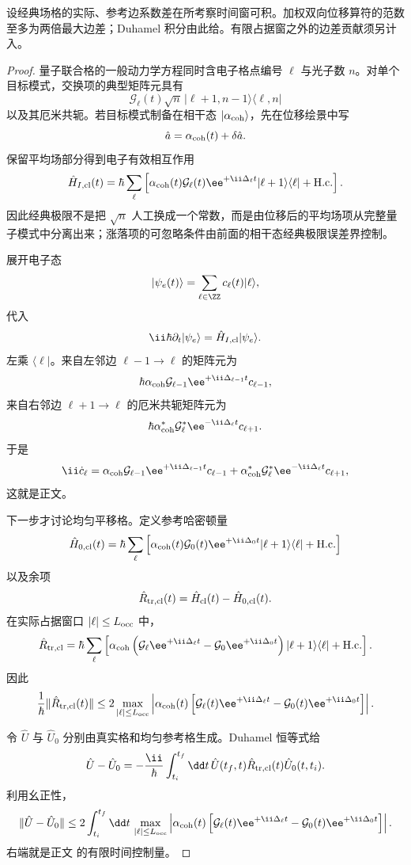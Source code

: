 \begin{proposition}[经典相干格的均匀化误差]
设经典场格的实际、参考边系数差在所考察时间窗可积。加权双向位移算符的范数至多为两倍最大边差；Duhamel 积分由此给。有限占据窗之外的边差贡献须另计入。
\end{proposition}
\begin{proof}
量子联合格的一般动力学方程同时含电子格点编号 $\ell$ 与光子数 $n$。对单个目标模式，交换项的典型矩阵元具有
\[
\mathcal G_\ell(t)
\sqrt{n}\,
|\ell+1,n-1\rangle\langle\ell,n|
\]
以及其厄米共轭。若目标模式制备在相干态 $|\alpha_{\rm coh}\rangle$，先在位移绘景中写
\[
\hat a
=
\alpha_{\rm coh}(t)
+\delta\hat a.
\]
保留平均场部分得到电子有效相互作用
\[
\hat H_{I,\rm cl}(t)
=
\hbar\sum_\ell
\left[
\alpha_{\rm coh}(t)
\mathcal G_\ell(t)
\ee^{+\ii\Delta_\ell t}
|\ell+1\rangle\langle\ell|
+\mathrm{H.c.}
\right].
\]
因此经典极限不是把 $\sqrt n$ 人工换成一个常数，而是由位移后的平均场项从完整量子模式中分离出来；涨落项的可忽略条件由前面的相干态经典极限误差界控制。

展开电子态
\[
|\psi_e(t)\rangle
=
\sum_{\ell\in\ZZ}
c_\ell(t)|\ell\rangle,
\]
代入
\[
\ii\hbar\partial_t|\psi_e\rangle
=
\hat H_{I,\rm cl}|\psi_e\rangle.
\]
左乘 $\langle\ell|$。来自左邻边 $\ell-1\to\ell$ 的矩阵元为
\[
\hbar
\alpha_{\rm coh}
\mathcal G_{\ell-1}
\ee^{+\ii\Delta_{\ell-1}t}
c_{\ell-1},
\]
来自右邻边 $\ell+1\to\ell$ 的厄米共轭矩阵元为
\[
\hbar
\alpha_{\rm coh}^*
\mathcal G_\ell^*
\ee^{-\ii\Delta_\ell t}
c_{\ell+1}.
\]
于是
\[
{
\ii\dot c_\ell
=
\alpha_{\rm coh}\mathcal G_{\ell-1}
\ee^{+\ii\Delta_{\ell-1}t}c_{\ell-1}
+
\alpha_{\rm coh}^*\mathcal G_\ell^*
\ee^{-\ii\Delta_\ell t}c_{\ell+1},
}
\]
这就是正文。

下一步才讨论均匀平移格。定义参考哈密顿量
\[
\hat H_{0,\rm cl}(t)
=
\hbar\sum_\ell
\left[
\alpha_{\rm coh}(t)\mathcal G_0(t)
\ee^{+\ii\Delta_0 t}
|\ell+1\rangle\langle\ell|
+\mathrm{H.c.}
\right]
\]
以及余项
\[
\hat R_{\rm tr,cl}(t)
=
\hat H_{\rm cl}(t)-\hat H_{0,\rm cl}(t).
\]
在实际占据窗口 $|\ell|\le L_{\rm occ}$ 中，
\[
\hat R_{\rm tr,cl}
=
\hbar\sum_\ell
\left[
\alpha_{\rm coh}
\left(
\mathcal G_\ell\ee^{+\ii\Delta_\ell t}
-\mathcal G_0\ee^{+\ii\Delta_0t}
\right)
|\ell+1\rangle\langle\ell|
+\mathrm{H.c.}
\right].
\]
因此
\[
\frac1\hbar
\|\hat R_{\rm tr,cl}(t)\|
\le
2
\max_{|\ell|\le L_{\rm occ}}
\left|
\alpha_{\rm coh}(t)
\left[
\mathcal G_\ell(t)\ee^{+\ii\Delta_\ell t}
-\mathcal G_0(t)\ee^{+\ii\Delta_0t}
\right]
\right|.
\]

令 $\hat U$ 与 $\hat U_0$ 分别由真实格和均匀参考格生成。Duhamel 恒等式给
\[
\hat U-\hat U_0
=
-\frac{\ii}{\hbar}
\int_{t_i}^{t_f}\dd t\,
\hat U(t_f,t)
\hat R_{\rm tr,cl}(t)
\hat U_0(t,t_i).
\]
利用幺正性，
\[
\|\hat U-\hat U_0\|
\le
2\int_{t_i}^{t_f}\dd t\,
\max_{|\ell|\le L_{\rm occ}}
\left|
\alpha_{\rm coh}(t)
\left[
\mathcal G_\ell(t)\ee^{+\ii\Delta_\ell t}
-\mathcal G_0(t)\ee^{+\ii\Delta_0t}
\right]
\right|.
\]
右端就是正文 的有限时间控制量。


\end{proof}
